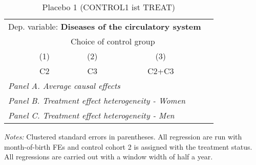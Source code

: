  \begin{table}[H] \centering \begin{threeparttable} \caption{Placebo 1 (CONTROL1 ist TREAT) } {\def\sym#1{\ifmmode^{#1}\else\(^{#1}\)\fi} \begin{tabular}{l*{4}{c}} \toprule \multicolumn{4}{l}{Dep. variable: \textbf{Diseases of the circulatory system}} \\ & \multicolumn{3}{c}{Choice of control group} \\ \cmidrule(lr){2-4}
            &\multicolumn{1}{c}{(1)}&\multicolumn{1}{c}{(2)}&\multicolumn{1}{c}{(3)}\\
            &\multicolumn{1}{c}{C2}&\multicolumn{1}{c}{C3}&\multicolumn{1}{c}{C2+C3}\\
\midrule
 \multicolumn{4}{l}{\emph{Panel A. Average causal effects}} \\      \midrule\multicolumn{4}{l}{\emph{Panel B. Treatment effect heterogeneity - Women}} \\      \midrule\multicolumn{4}{l}{\emph{Panel C. Treatment effect heterogeneity - Men}} \\      
\bottomrule \end{tabular} } \begin{tablenotes} \item \scriptsize \emph{Notes:} Clustered standard errors in parentheses. All regression are run with month-of-birth FEs and control cohort 2 is assigned with the treatment status. All regressions are carried out with a window width of half a year. \end{tablenotes} \end{threeparttable} \end{table} 

